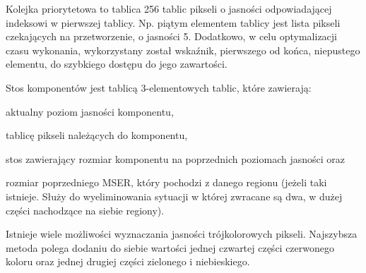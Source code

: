 Kolejka priorytetowa to tablica 256 tablic pikseli o jasności odpowiadającej
indeksowi w pierwszej tablicy. Np. piątym elementem tablicy jest lista pikseli
czekających na przetworzenie, o jasności 5. Dodatkowo, w celu optymalizacji
czasu wykonania, wykorzystany został wskaźnik, pierwszego od końca, niepustego
elementu, do szybkiego dostępu do jego zawartości.

Stos komponentów jest tablicą 3-elementowych tablic, które zawierają:
\begin{inparaenum} \item aktualny poziom jasności
  komponentu, \item tablicę pikseli należących do komponentu, \item stos
  zawierający rozmiar komponentu na poprzednich poziomach jasności oraz \item
  rozmiar poprzedniego MSER, który pochodzi z danego regionu (jeżeli taki
  istnieje. Służy do wyeliminowania sytuacji w której zwracane są dwa, w dużej
  części nachodzące na siebie regiony).  \end{inparaenum}

Istnieje wiele możliwości wyznaczania jasności trójkolorowych pikseli.
Najszybsza metoda polega dodaniu do siebie wartości jednej czwartej części
czerwonego koloru oraz jednej drugiej części zielonego i niebieskiego.
